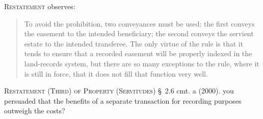 \textsc{Restatement} observes:
\begin{quote}
To avoid the prohibition, two conveyances must be used: the first conveys the
easement to the intended beneficiary; the second conveys the servient estate to
the intended transferee. The only virtue of the rule is that it tends to ensure
that a recorded easement will be properly indexed in the land-records system,
but there are so many exceptions to the rule, where it is still in force, that
it does not fill that function very well.
\end{quote}
\textsc{Restatement (Third) of Property (Servitudes)} \S~2.6 cmt. a (2000).
you persuaded that the benefits of a separate transaction for recording purposes
outweigh the costs?

